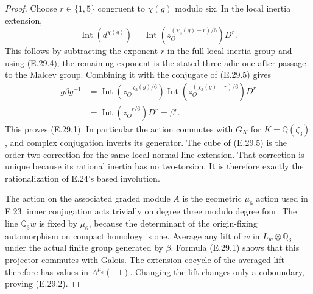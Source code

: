\begin{proof}
Choose $r\in\{1,5\}$ congruent to $\chi(g)$
modulo six. In the local inertia extension,
\[
 \operatorname{Int}(d^{\chi(g)})
    =\operatorname{Int}
       \left(z_O^{(\chi_3(g)-r)/6}\right)D^r.
\]
This follows by subtracting the exponent $r$ in
the full local inertia group and using (E.29.4);
the remaining exponent is the stated three-adic
one after passage to the Malcev group. Combining
it with the conjugate of (E.29.5) gives
\[
 \begin{aligned}
 g\beta g^{-1}
 &=\operatorname{Int}(z_O^{-\chi_3(g)/6})
       \operatorname{Int}
          (z_O^{(\chi_3(g)-r)/6})D^r\\
 &=\operatorname{Int}(z_O^{-r/6})D^r
   =\beta^r.
 \end{aligned}
\]
This proves (E.29.1). In particular the action
commutes with $G_K$ for $K=\mathbb Q(\zeta_3)$,
and complex conjugation inverts its generator.
The cube of (E.29.5) is the order-two correction
for the same local normal-line extension. That
correction is unique because its rational inertia
has no two-torsion. It is therefore exactly the
rationalization of E.24's based involution.

The action on the associated graded module $A$
is the geometric $\mu_6$ action used in E.23:
inner conjugation acts trivially on degree three
modulo degree four. The line $\mathbb Q_3w$
is fixed by $\mu_6$, because the determinant of
the origin-fixing automorphism on compact
homology is one. Average any lift of $w$ in
$L_w\otimes\mathbb Q_3$ under the actual finite
group generated by $\beta$. Formula (E.29.1)
shows that this projector commutes with Galois.
The extension cocycle of the averaged lift
therefore has values in $A^{\mu_6}(-1)$.
Changing the lift changes only a coboundary,
proving (E.29.2).


\end{proof}
